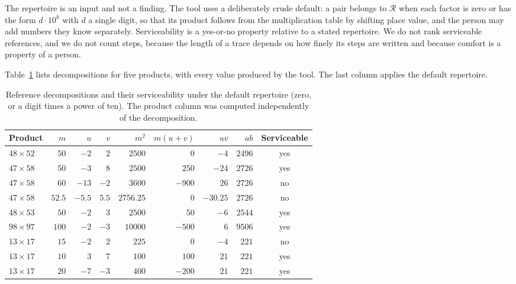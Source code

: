 \documentclass[11pt]{article}
\theoremstyle{definition}
\theoremstyle{remark}
\begin{document}
The repertoire is an input and not a finding. The tool uses a deliberately crude default: a pair belongs to $\mathcal R$ when each factor is zero or has the form $d\cdot 10^k$ with $d$ a single digit, so that its product follows from the multiplication table by shifting place value, and the person may add numbers they know separately. Serviceability is a yes-or-no property relative to a stated repertoire. We do not rank serviceable references, and we do not count steps, because the length of a trace depends on how finely its steps are written and because comfort is a property of a person.

Table~\ref{tab:refs} lists decompositions for five products, with every value produced by the tool. The last column applies the default repertoire.

\begin{table}[t]
\centering
\small
\setlength{\tabcolsep}{5pt}
\begin{tabular}{@{}lrrrrrrrc@{}}
\toprule
Product & $m$ & $u$ & $v$ & $m^2$ & $m(u+v)$ & $uv$ & $ab$ & Serviceable \\
\midrule
$48\times 52$ & $50$ & $-2$ & $2$ & $2500$ & $0$ & $-4$ & $2496$ & yes \\
\addlinespace
$47\times 58$ & $50$ & $-3$ & $8$ & $2500$ & $250$ & $-24$ & $2726$ & yes \\
$47\times 58$ & $60$ & $-13$ & $-2$ & $3600$ & $-900$ & $26$ & $2726$ & no \\
$47\times 58$ & $52.5$ & $-5.5$ & $5.5$ & $2756.25$ & $0$ & $-30.25$ & $2726$ & no \\
\addlinespace
$48\times 53$ & $50$ & $-2$ & $3$ & $2500$ & $50$ & $-6$ & $2544$ & yes \\
\addlinespace
$98\times 97$ & $100$ & $-2$ & $-3$ & $10000$ & $-500$ & $6$ & $9506$ & yes \\
\addlinespace
$13\times 17$ & $15$ & $-2$ & $2$ & $225$ & $0$ & $-4$ & $221$ & no \\
$13\times 17$ & $10$ & $3$ & $7$ & $100$ & $100$ & $21$ & $221$ & yes \\
$13\times 17$ & $20$ & $-7$ & $-3$ & $400$ & $-200$ & $21$ & $221$ & yes \\
\bottomrule
\end{tabular}
\caption{Reference decompositions and their serviceability under the default repertoire (zero, or a digit times a power of ten). The product column was computed independently of the decomposition.}
\label{tab:refs}
\end{table}
\end{document}
